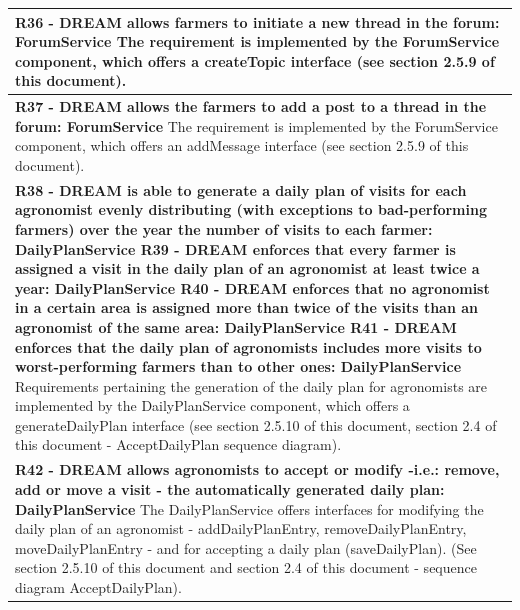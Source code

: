 \documentclass{article}
\begin{document}
\begin{longtable}[c]{|m{11.75cm}|}
    \textbf{R36 - DREAM allows farmers to initiate a new thread in the forum: ForumService}
    \newline\newline
    The requirement is implemented by the ForumService component, which offers a createTopic interface (see section 2.5.9 of this document).\\
    \hline
    
    \textbf{R37 - DREAM allows the farmers to add a post to a thread in the forum: ForumService}
    \newline\newline
    The requirement is implemented by the ForumService component, which offers an addMessage interface (see section 2.5.9 of this document).\\
    \hline
    
    \textbf{R38 - DREAM is able to generate a daily plan of visits for each agronomist evenly distributing (with exceptions to bad-performing farmers) over the year the number of visits to each farmer: DailyPlanService
    \newline\newline
    R39 - DREAM enforces that every farmer is assigned a visit in the daily plan of an agronomist at least twice a year: DailyPlanService
    \newline\newline
    R40 - DREAM enforces that no agronomist in a certain area is assigned more than twice of the visits than an agronomist of the same area: DailyPlanService
    \newline\newline
    R41 - DREAM enforces that the daily plan of agronomists includes more visits to worst-performing farmers than to other ones: DailyPlanService}
    \newline\newline
    Requirements pertaining the generation of the daily plan for agronomists are implemented by the DailyPlanService component, which offers a generateDailyPlan interface (see section 2.5.10 of this document, section 2.4 of this document - AcceptDailyPlan sequence diagram). \\
    \hline
    
    \textbf{R42 - DREAM allows agronomists to accept or modify -i.e.: remove, add or move a visit - the automatically generated daily plan: DailyPlanService}
    \newline\newline
    The DailyPlanService offers interfaces for modifying the daily plan of an agronomist - addDailyPlanEntry, removeDailyPlanEntry, moveDailyPlanEntry - and for accepting a daily plan (saveDailyPlan). (See section 2.5.10 of this document and section 2.4 of this document - sequence diagram AcceptDailyPlan).\\
    \hline
    

\end{longtable}
\end{document}
